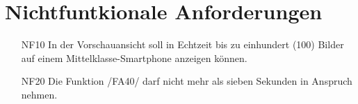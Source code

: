 \documentclass[parskip=full]{scrartcl}
\begin{document}
\section{Nichtfuntkionale Anforderungen}
\begin{itemize}[nosep]
\item[NF10] In der Vorschauansicht soll in Echtzeit bis zu einhundert (100)
Bilder auf einem Mittelklasse-Smartphone anzeigen können.
\item[NF20] Die Funktion /FA40/ darf nicht mehr als sieben Sekunden in Anspruch nehmen.
    
\end{itemize}
\printnoidxglossaries
\end{document}
